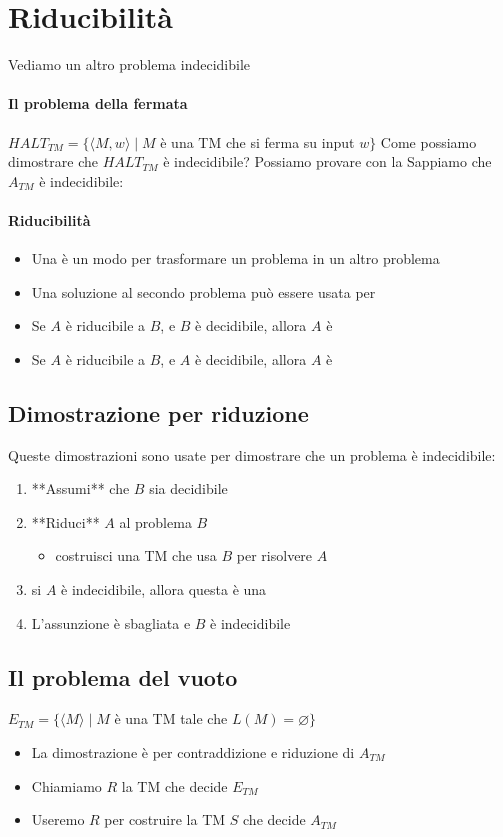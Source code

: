 \section{Riducibilità}
Vediamo un altro problema indecidibile
\paragraph{Il problema della fermata}
$HALT_{TM}=\{\langle M,w\rangle\mid M$ è una TM che si ferma su input $w\}$ 
Come possiamo dimostrare che $HALT_{TM}$ è indecidibile? 
Possiamo provare con la  
Sappiamo che $A_{TM}$ è indecidibile: 

\paragraph{Riducibilità}
\begin{itemize}
	\item Una  è un modo per trasformare un problema in un altro problema
	\item Una soluzione al secondo problema può essere usata per  
	\item Se $A$ è riducibile a $B$, e $B$ è decidibile, allora $A$ è  
	\item Se $A$ è riducibile a $B$, e $A$ è decidibile, allora $A$ è  
\end{itemize}
\subsection{Dimostrazione per riduzione }
Queste dimostrazioni sono usate per dimostrare che un problema è indecidibile: 
\begin{enumerate}
	\item **Assumi** che $B$ sia decidibile
	\item **Riduci** $A$ al problema $B$ 
		\begin{itemize}
			\item costruisci una TM che usa $B$ per risolvere $A$ 
		\end{itemize}
	\item si $A$ è indecidibile, allora questa è una  
	\item L'assunzione è sbagliata e $B$ è indecidibile
\end{enumerate}

\subsection{Il problema del vuoto}
$E_{TM} = \{\langle M\rangle\mid M$ è una TM tale che $L(M)=\varnothing\}$ 
\begin{itemize}
	\item La dimostrazione è per contraddizione e riduzione di $A_{TM}$ 
	\item Chiamiamo $R$ la TM che decide $E_{TM}$ 
	\item Useremo $R$ per costruire la TM $S$ che decide $A_{TM}$ 
\end{itemize}

